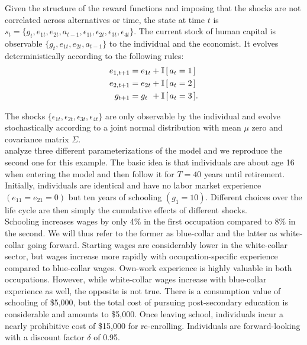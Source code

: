 \noindent Given the structure of the reward functions and imposing that the shocks are not correlated across alternatives or time, the state at time $t$ is $s_t = \{g_t,e_{1t},e_{2t},a_{t - 1},\epsilon_{1t},\epsilon_{2t},\epsilon_{3t},\epsilon_{4t}\}$.
%
The current stock of human capital is observable $\{g_t,e_{1t},e_{2t},a_{t - 1}\}$ to the individual and the economist. It evolves deterministically according to the following rules:
%
\begin{align*}
    e_{1,t+1} &= e_{1t} + \mathbb{I}\,[\,a_t = 1\,] \\
    e_{2,t+1} &= e_{2t} + \mathbb{I}\,[\,a_t = 2\,] \\
    g_{t+1}   &= g_{t\phantom{2}}    +  \mathbb{I}\,[\,a_t = 3\,].
\end{align*}

\noindent The shocks $\{\epsilon_{1t},\epsilon_{2t},\epsilon_{3t},\epsilon_{4t}\}$ are only observable by the individual and evolve stochastically according to a joint normal distribution with mean $\mu$ zero and covariance matrix $\Sigma$.\\

\noindent \citet{Keane.1994} analyze three different parameterizations of the model and we reproduce the second one for this example. The basic idea is that individuals are about age 16 when entering the model and then follow it for $T = 40$ years until retirement. Initially, individuals are identical and have no labor market experience $(e_{11} = e_{21} = 0)$ but ten years of schooling $(g_1 = 10)$. Different choices over the life cycle are then simply the cumulative effects of different shocks.\\

\noindent Schooling increases wages by only 4\% in the first occupation compared to 8\% in the second. We will thus refer to the former as blue-collar and the latter as white-collar going forward. Starting wages are considerably lower in the white-collar sector, but wages increase more rapidly with occupation-specific experience compared to blue-collar wages. Own-work experience is highly valuable in both occupations. However, while white-collar wages increase with blue-collar experience as well, the opposite is not true. There is a consumption value of schooling of \$5,000, but the total cost of pursuing post-secondary education is considerable and amounts to \$5,000. Once leaving school, individuals incur a nearly prohibitive cost of \$15,000 for re-enrolling. Individuals are forward-looking with a discount factor $\delta$ of 0.95.\\

